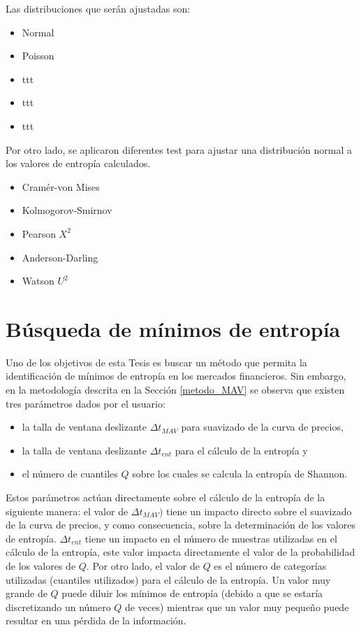 Las distribuciones que serán ajustadas son:

\begin{itemize}
	\item Normal
	\item Poisson
	\item ttt
	\item ttt
	\item ttt
\end{itemize}


Por otro lado, se aplicaron diferentes test para ajustar una distribución normal a los valores de entropía calculados.
\begin{itemize}
	\item Cramér-von Mises
	\item Kolmogorov-Smirnov
	\item Pearson $X^2$
	\item Anderson-Darling
	\item Watson $U^2$
\end{itemize}



\section{Búsqueda de mínimos de entropía}

Uno de los objetivos de esta Tesis es buscar un método que permita la identificación de mínimos de entropía en los mercados financieros.
Sin embargo, en la metodología descrita en la Sección \ref{metodo_MAV} se observa que existen tres parámetros dados por el usuario:
\begin{itemize}
	\item la talla de ventana deslizante $\Delta t_{MAV}$ para suavizado de la curva de precios,
	\item la talla de ventana deslizante $\Delta t_{ent}$ para el cálculo de la entropía y
	\item el número de cuantiles $Q$ sobre los cuales se calcula la entropía de Shannon.
\end{itemize}

Estos parámetros actúan directamente sobre el cálculo de la entropía de la siguiente manera: 
el valor de $\Delta t_{MAV})$ tiene un impacto directo sobre el suavizado de la curva de precios, y como consecuencia, sobre la determinación de los valores de entropía. 
$\Delta t_{ent}$ tiene un impacto en el número de muestras utilizadas en el cálculo de la entropía, este valor impacta directamente el valor de la probabilidad de los valores de $Q$. 
Por otro lado, el valor de $Q$ es el número de categorías utilizadas (cuantiles utilizados) para el cálculo de la entropía. 
Un valor muy grande de $Q$ puede diluir los mínimos de entropía (debido a que se estaría discretizando un número $Q$ de veces) mientras que un valor muy pequeño puede resultar en una pérdida de la información.

